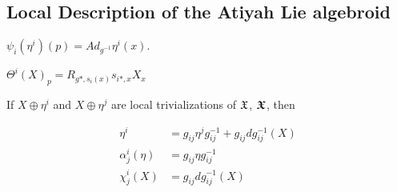 \subsection{Local Description of the Atiyah Lie algebroid}

$\psi_i(\eta^i)(p) = Ad_{g^{-1}}\eta^i(x)$.

$\Theta^i(X)_p = R_{g*, s_i(x)} s_{i*, x} X_x$

If $X \oplus \eta^i$ and $X \oplus \eta^j$ are local trivializations of $\mathfrak{X}$, $\bm{\mathfrak{X}}$, then

\begin{align}
    \eta^i &= g_{ij} \eta^j g_{ij}^{-1} + g_{ij} dg^{-1}_{ij}(X) \\
    \alpha^i_j(\eta) &= g_{ij} \eta  g_{ij}^{-1} \\
     \chi^i_j(X) &= g_{ij} dg_{ij}^{-1}(X) 
\end{align}




